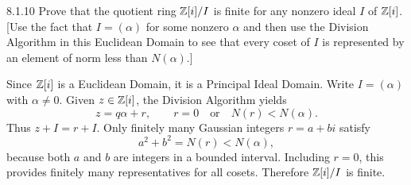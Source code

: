 \documentclass[11pt,oneside]{article}
\begin{document}
\begin{exercise}{8.1.10}
Prove that the quotient ring $\mathbb{Z}[i]/I$ is finite for any nonzero ideal $I$ of $\mathbb{Z}[i]$. [Use the fact that $I=(\alpha)$ for some nonzero $\alpha$ and then use the Division Algorithm in this Euclidean Domain to see that every coset of $I$ is represented by an element of norm less than $N(\alpha)$.]
\end{exercise}
\begin{solution}
Since $\mathbb{Z}[i]$ is a Euclidean Domain, it is a Principal Ideal Domain. Write $I=(\alpha)$ with $\alpha\neq0$. Given $z\in\mathbb{Z}[i]$, the Division Algorithm yields
\[
z=q\alpha+r,\qquad r=0\quad\text{or}\quad N(r)<N(\alpha).
\]
Thus $z+I=r+I$. Only finitely many Gaussian integers $r=a+bi$ satisfy
\[
a^2+b^2=N(r)<N(\alpha),
\]
because both $a$ and $b$ are integers in a bounded interval. Including $r=0$, this provides finitely many representatives for all cosets. Therefore $\mathbb{Z}[i]/I$ is finite.
\end{solution}
\end{document}
